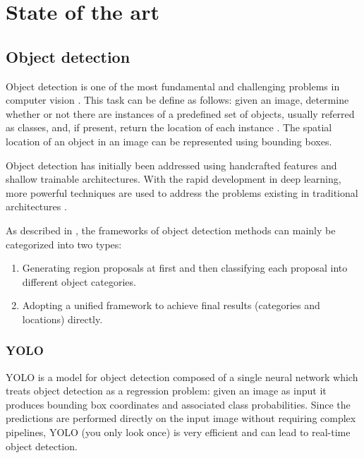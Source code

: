\chapter{State of the art}
\label{chap:sota}

\section{Object detection}
Object detection is one of the most fundamental and challenging problems in computer vision \cite{zou2019object}. This task can be define as follows: given an image, determine whether or not there are instances of a predefined set of objects, usually referred as classes, and, if present, return the location of each instance \cite{liu2020deep}. The spatial location of an object in an image can be represented using bounding boxes.

Object detection has initially been addressed using handcrafted features and shallow trainable architectures.
With the rapid development in deep learning, more powerful techniques are used to address the problems existing in traditional architectures \cite{zhao2019object}. 

As described in \cite{zhao2019object}, the frameworks of object detection methods can mainly be categorized into two types:
\begin{enumerate}
    \item Generating region proposals at first and then classifying each proposal into different object categories.
    \item Adopting a unified framework to achieve final results (categories and locations) directly.
\end{enumerate} 

\subsection{YOLO}
YOLO \cite{redmon2016you} is a model for object detection composed of a single neural network which treats object detection as a regression problem: given an image as input it produces bounding box coordinates and associated class probabilities. Since the predictions are performed directly on the input image without requiring complex pipelines, YOLO (you only look once) is very efficient and can lead to real-time object detection.

